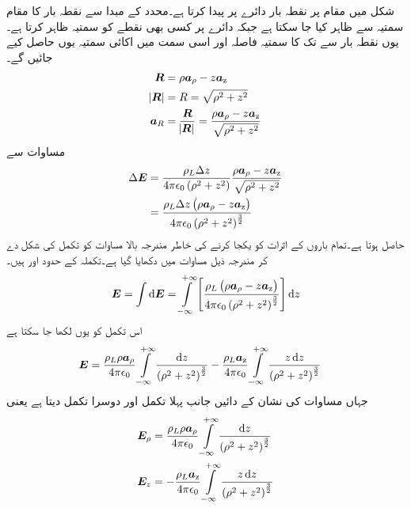 شکل  میں مقام  پر نقطہ بار   دائرے پر  پیدا کرتا ہے۔محدد کے مبدا سے نقطہ بار کا مقام سمتیہ  سے ظاہر کیا جا سکتا ہے جبکہ دائرے پر کسی بھی نقطے  کو سمتیہ  ظاہر کرتا ہے۔یوں نقطہ بار سے   تک کا سمتیہ فاصلہ اور اسی سمت میں اکائی سمتیہ یوں حاصل کیے جائیں گے۔
\begin{align*}
{\ensuremath{{\boldsymbol{R}}}}&=\rho {\boldsymbol{a}}_{\rho}-z{\boldsymbol{a}}_{\textup{z}}\\
\abs{{{\boldsymbol{R}}}}&=R=\sqrt{\rho^2+z^2}\\
{{\boldsymbol{a}}}_R&=\frac{{{\boldsymbol{R}}}}{\abs{{{\boldsymbol{R}}}}}=\frac{\rho {\boldsymbol{a}}_{\rho}-z{\boldsymbol{a}}_{\textup{z}}}{\sqrt{\rho^2+z^2}}
\end{align*}
مساوات  سے
\begin{align*}
\Delta {\ensuremath{{\boldsymbol{E}}}}&=\frac{\rho_L \Delta z}{4 \pi \epsilon_0 \left(\rho^2+z^2 \right)} \frac{\rho {\boldsymbol{a}}_{\rho}-z{\boldsymbol{a}}_{\textup{z}}}{\sqrt{\rho^2+z^2}}\\
&=\frac{\rho_L \Delta z \left(\rho {\boldsymbol{a}}_{\rho}-z{\boldsymbol{a}}_{\textup{z}} \right)}{4 \pi \epsilon_0\left(\rho^2+z^2 \right)^{\frac{3}{2}}}
\end{align*}
حاصل ہوتا ہے۔تمام باروں کے اثرات کو یکجا کرنے کی خاطر مندرجہ بالا مساوات کو تکمل کی شکل دے کر مندرجہ ذیل مساوات میں دکھایا گیا ہے۔تکملہ کے حدود  اور   ہیں۔
\begin{align}
\kvec{E}=\int \dif  \kvec{E}=\int\limits_{-\infty}^{+\infty} \left[\frac{\rho_L \left(\rho \arho-z\az \right)}{4 \pi \epsilon_0\left(\rho^2+z^2 \right)^{\frac{3}{2}}}\right] \dif z
\end{align}
اس تکمل کو یوں لکھا جا سکتا ہے
\begin{align}\label{مساوات_کولمب_لامحدود_لکیر_بار_کا_میدان}
\kvec{E}&=\frac{\rho_L \rho \arho}{4 \pi \epsilon_0}\int\limits_{-\infty}^{+\infty} \frac{\dif z }{\left(\rho^2+z^2 \right)^{\frac{3}{2}}} -\frac{\rho_L \az}{4 \pi \epsilon_0}\int\limits_{-\infty}^{+\infty} \frac{z \dif z}{\left(\rho^2+z^2 \right)^{\frac{3}{2}}}
\end{align}
جہاں مساوات کی نشان کے دائیں جانب پہلا تکمل  \Erho اور دوسرا تکمل \Ez دیتا ہے  یعنی
\begin{gather}
\begin{aligned}\label{مساوات_کولمب_رداسی_اور_عمودی_برقی_میدان}
\Erho&=\frac{\rho_L \rho \arho}{4 \pi \epsilon_0}\int\limits_{-\infty}^{+\infty} \frac{\dif z }{\left(\rho^2+z^2 \right)^{\frac{3}{2}}}\\
\Ez&=-\frac{\rho_L \az}{4 \pi \epsilon_0}\int\limits_{-\infty}^{+\infty} \frac{z \dif z}{\left(\rho^2+z^2 \right)^{\frac{3}{2}}}
\end{aligned}
\end{gather}

